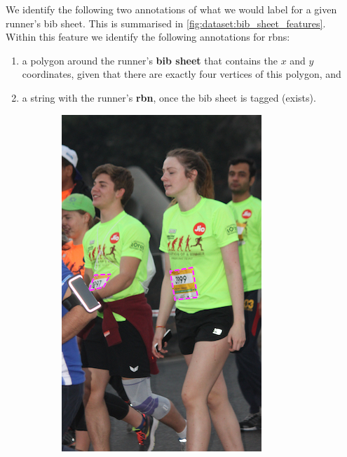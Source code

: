 We identify the following two annotations of what we would label for a given runner's bib sheet. This is summarised in \cref{fig:dataset:bib_sheet_features}. Within this feature we identify the following annotations for \glspl{rbn}:

\begin{enumerate}
  \item a polygon around the runner's \textbf{bib sheet} that contains the $x$ and $y$ coordinates, given that there are exactly four vertices of this polygon, and
  \item a string with the runner's \textbf{\gls{rbn}}, once the bib sheet is tagged (exists).
\end{enumerate}

\begin{figure}[p]
  \centering
  \hspace{\fill}
  \begin{subfigure}[b]{0.25\textwidth}
    \includegraphics[width=\textwidth]{images/dataset/BibSheet_Detection}

\end{subfigure}
\end{figure}
